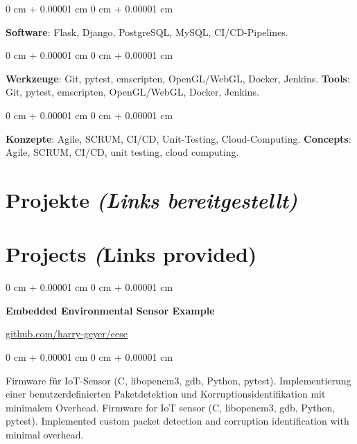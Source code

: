 \documentclass[10pt, letterpaper]{article}
\newenvironment{onecolentry}{
    \begin{adjustwidth}{
        0 cm + 0.00001 cm
    }{
        0 cm + 0.00001 cm
    }
}{
    \end{adjustwidth}
}
\newenvironment{twocolentry}[2][]{
    \onecolentry
    \def\secondColumn{#2}
    \setcolumnwidth{\fill, 4.75 cm}
    \begin{paracol}{2}
}{
    \switchcolumn \raggedleft \secondColumn
    \end{paracol}
    \endonecolentry
}
\begin{document}
        \vspace{0.2 cm}

        \begin{onecolentry}
            \textbf{Software}: Flask, Django, PostgreSQL, MySQL, CI/CD-Pipelines.
        \end{onecolentry}

        \vspace{0.2 cm}

        \begin{onecolentry}
            \ifdefined\german
            \textbf{Werkzeuge}: Git, pytest, emscripten, OpenGL/WebGL, Docker, Jenkins.
            \else
            \textbf{Tools}: Git, pytest, emscripten, OpenGL/WebGL, Docker, Jenkins.
            \fi
        \end{onecolentry}

        \vspace{0.2 cm}

        \begin{onecolentry}
            \ifdefined\german
            \textbf{Konzepte}: Agile, SCRUM, CI/CD, Unit-Testing, Cloud-Computing.
            \else
            \textbf{Concepts}: Agile, SCRUM, CI/CD, unit testing, cloud computing.
            \fi
        \end{onecolentry}

        \vspace{0.15 cm}

    \ifdefined\german
    \section{Projekte \textit{(Links bereitgestellt)}}
    \else
    \section{Projects \textit(Links provided)}
    \fi

        \begin{twocolentry}{\href{https://github.com/harry-geyer/eese}{github.com/harry-geyer/eese}}
            \textbf{Embedded Environmental Sensor Example}
        \end{twocolentry}

        \vspace{0.10 cm}
        \begin{onecolentry}
            \ifdefined\german
            Firmware für IoT-Sensor (C, libopencm3, gdb, Python, pytest). Implementierung einer benutzerdefinierten Paketdetektion und Korruptionsidentifikation mit minimalem Overhead.
            \else
            Firmware for IoT sensor (C, libopencm3, gdb, Python, pytest). Implemented custom packet detection and corruption identification with minimal overhead.
            \fi
        \end{onecolentry}
\end{document}
